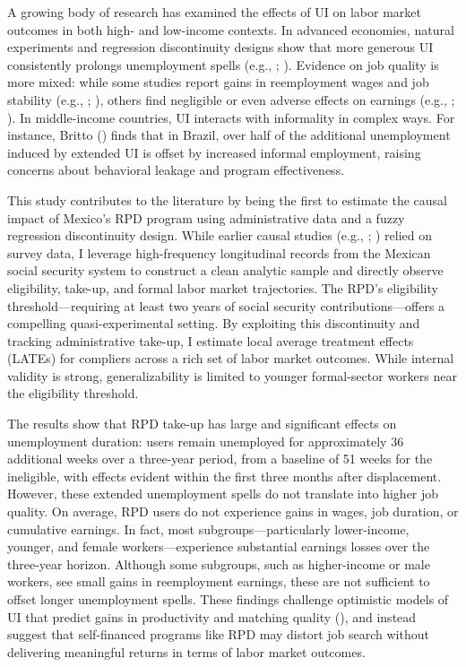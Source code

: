\documentclass[
  4pt,
]{report}
\begin{document}
A growing body of research has examined the effects of UI on labor
market outcomes in both high- and low-income contexts. In advanced
economies, natural experiments and regression discontinuity designs show
that more generous UI consistently prolongs unemployment spells (e.g.,
;
).
Evidence on job quality is more mixed: while some studies report gains
in reemployment wages and job stability (e.g.,
;
), others find
negligible or even adverse effects on earnings (e.g.,
;
). In middle-income
countries, UI interacts with informality in complex ways. For instance,
Britto () finds that in Brazil, over half
of the additional unemployment induced by extended UI is offset by
increased informal employment, raising concerns about behavioral leakage
and program effectiveness.

This study contributes to the literature by being the first to estimate
the causal impact of Mexico's RPD program using administrative data and
a fuzzy regression discontinuity design. While earlier causal studies
(e.g., ; )
relied on survey data, I leverage high-frequency longitudinal records
from the Mexican social security system to construct a clean analytic
sample and directly observe eligibility, take-up, and formal labor
market trajectories. The RPD's eligibility threshold---requiring at
least two years of social security contributions---offers a compelling
quasi-experimental setting. By exploiting this discontinuity and
tracking administrative take-up, I estimate local average treatment
effects (LATEs) for compliers across a rich set of labor market
outcomes. While internal validity is strong, generalizability is limited
to younger formal-sector workers near the eligibility threshold.

The results show that RPD take-up has large and significant effects on
unemployment duration: users remain unemployed for approximately 36
additional weeks over a three-year period, from a baseline of 51 weeks
for the ineligible, with effects evident within the first three months
after displacement. However, these extended unemployment spells do not
translate into higher job quality. On average, RPD users do not
experience gains in wages, job duration, or cumulative earnings. In
fact, most subgroups---particularly lower-income, younger, and female
workers---experience substantial earnings losses over the three-year
horizon. Although some subgroups, such as higher-income or male workers,
see small gains in reemployment earnings, these are not sufficient to
offset longer unemployment spells. These findings challenge optimistic
models of UI that predict gains in productivity and matching quality
(), and instead
suggest that self-financed programs like RPD may distort job search
without delivering meaningful returns in terms of labor market outcomes.
\end{document}
